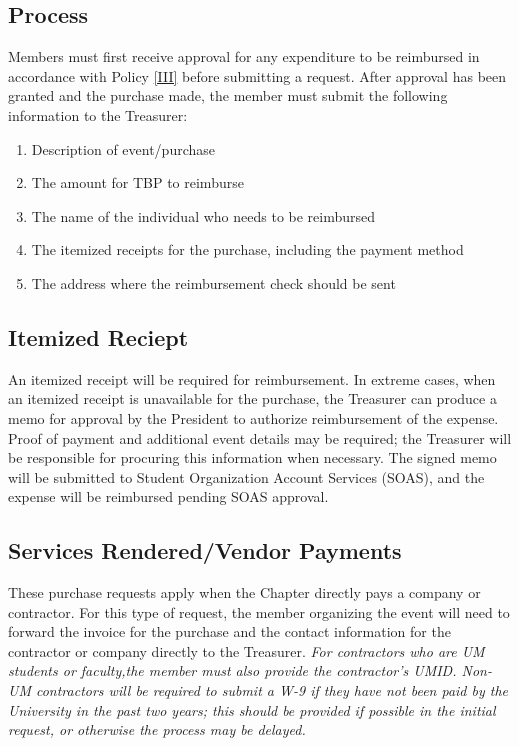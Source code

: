 
\subsection{Process} \label{VI.1}
Members must first receive approval for any expenditure to be reimbursed in accordance with Policy \ref{III} before submitting a request. 
After approval has been granted and the purchase made, the member must submit the following information to the Treasurer:
\begin{enumerate}
    \item Description of event/purchase
    \item The amount for TBP to reimburse
    \item The name of the individual who needs to be reimbursed
    \item The itemized receipts for the purchase, including the payment method
    \item The address where the reimbursement check should be sent
\end{enumerate}

\subsection{Itemized Reciept} \label{VI.2}
An itemized receipt will be required for reimbursement. 
In extreme cases, when an itemized receipt is unavailable for the purchase, the Treasurer can produce a memo for approval by the President to authorize reimbursement of the expense. 
Proof of payment and additional event details may be required; the Treasurer will be responsible for procuring this information when necessary. 
The signed memo will be submitted to Student Organization Account Services (SOAS), and the expense will be reimbursed pending SOAS approval.

\subsection{Services Rendered/Vendor Payments} \label{VI.3}
These purchase requests apply when the Chapter directly pays a company or contractor. For this type of request, the member organizing the event will need to forward 
the invoice for the purchase and the contact information for the contractor or company directly to the Treasurer. 
\textit{For contractors who are UM students or faculty,the member must also provide the contractor’s UMID. 
Non-UM contractors will be required to submit a W-9 if they have not been paid by the University in the past two years; this should be provided if possible in the 
initial request, or otherwise the process may be delayed.}

